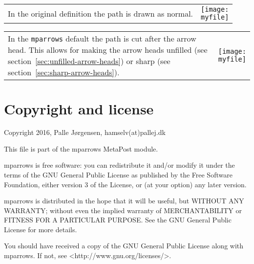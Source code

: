 \documentclass[paper=a4,11pt,UKenglish,DIV=calc,BCOR=0mm,parskip=half,fleqn]{scrartcl}
\makeatletter
\newenvironment{example}[1]{%
  \def\myfile{#1}
  \begin{tabular}{@{}p{.67\linewidth-\tabcolsep}p{.33\linewidth}@{}}
    \begin{minipage}[c]{\linewidth}}{%
    \end{minipage}
    &\parbox[c]{\linewidth}{\centering\texttt{[image: \\myfile]}}
  \end{tabular}}
\makeatother
\begin{document}
\begin{example}{mparrowsexamples31.mps}
  In the original definition the path is drawn as normal.
\end{example}

\begin{example}{mparrowsexamples32.mps}
  In the \texttt{mparrows} default the path is cut after the arrow
  head. This allows for making the arrow heads unfilled (see
  section~\ref{sec:unfilled-arrow-heads}) or sharp (see
  section~\ref{sec:sharp-arrow-heads}).
\end{example}

\clearpage

% 

\section{Copyright and license}
\label{sec:license}

Copyright 2016, Palle Jørgensen, hamselv(at)pallej.dk

This file is part of the mparrows MetaPost module.

mparrows is free software: you can redistribute it and/or modify it
under the terms of the GNU General Public License as published by the
Free Software Foundation, either version 3 of the License, or (at your
option) any later version.

mparrows is distributed in the hope that it will be useful, but
WITHOUT ANY WARRANTY; without even the implied warranty of
MERCHANTABILITY or FITNESS FOR A PARTICULAR PURPOSE. See the GNU
General Public License for more details.

You should have received a copy of the GNU General Public License
along with mparrows. If not, see <http://www.gnu.org/licenses/>.
\end{document}
